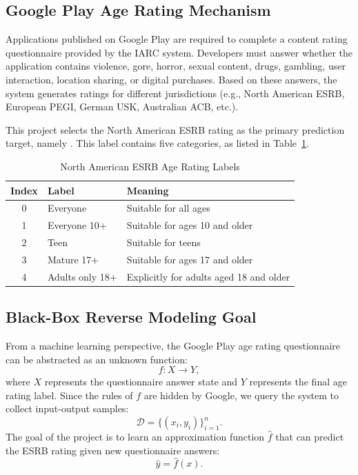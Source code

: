\documentclass[11pt,a4paper]{article}
\newcommand{\code}[1]{\texttt{\footnotesize\detokenize{#1}}}
\begin{document}
\subsection{Google Play Age Rating Mechanism}

Applications published on Google Play are required to complete a content rating questionnaire provided by the IARC system. Developers must answer whether the application contains violence, gore, horror, sexual content, drugs, gambling, user interaction, location sharing, or digital purchases. Based on these answers, the system generates ratings for different jurisdictions (e.g., North American ESRB, European PEGI, German USK, Australian ACB, etc.).

This project selects the North American ESRB rating as the primary prediction target, namely \code{rating__north_america}. This label contains five categories, as listed in Table~\ref{tab:labels}.

\begin{table}[H]
\centering
\caption{North American ESRB Age Rating Labels}
\label{tab:labels}
\renewcommand{\arraystretch}{1.25}
\begin{tabular}{cll}
\toprule
Index & Label & Meaning \\
\midrule
0 & Everyone & Suitable for all ages \\
1 & Everyone 10+ & Suitable for ages 10 and older \\
2 & Teen & Suitable for teens \\
3 & Mature 17+ & Suitable for ages 17 and older \\
4 & Adults only 18+ & Explicitly for adults aged 18 and older \\
\bottomrule
\end{tabular}
\end{table}

\subsection{Black-Box Reverse Modeling Goal}

From a machine learning perspective, the Google Play age rating questionnaire can be abstracted as an unknown function:
\[
f: X \rightarrow Y,
\]
where $X$ represents the questionnaire answer state and $Y$ represents the final age rating label. Since the rules of $f$ are hidden by Google, we query the system to collect input-output samples:
\[
\mathcal{D} = \{(x_i, y_i)\}_{i=1}^{n}.
\]
The goal of the project is to learn an approximation function $\hat{f}$ that can predict the ESRB rating given new questionnaire answers:
\[
\hat{y} = \hat{f}(x).
\]
\end{document}
